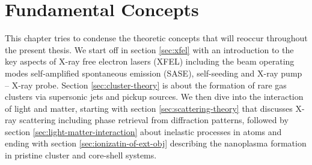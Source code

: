 \chapter{Fundamental Concepts}\label{ch:fundamental_concepts}
This chapter tries to condense the theoretic concepts that will reoccur throughout the present thesis. We start off in section \ref{sec:xfel} with an introduction to the key aspects of X-ray free electron lasers (XFEL) including the beam operating modes self-amplified spontaneous emission (SASE), self-seeding and X-ray pump -- X-ray probe. Section \ref{sec:cluster-theory} is about the formation of rare gas clusters via supersonic jets and pickup sources. We then dive into the interaction of light and matter, starting with section \ref{sec:scattering-theory} that discusses X-ray scattering including phase retrieval from diffraction patterns, followed by section \ref{sec:light-matter-interaction} about inelastic processes in atoms and ending with section \ref{sec:ionizatin-of-ext-obj} describing the nanoplasma formation in pristine cluster and core-shell systems.
%
%
%
